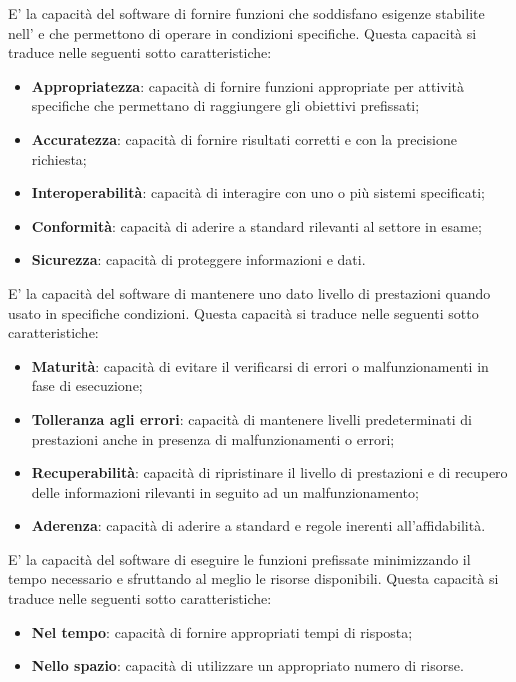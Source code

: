 	E' la capacità del software di fornire funzioni che soddisfano esigenze stabilite nell'\AdR{} e che permettono di operare in condizioni specifiche. Questa capacità si traduce nelle seguenti sotto caratteristiche:
	\begin{itemize}
		\item{\textbf{Appropriatezza}: capacità di fornire funzioni appropriate per attività specifiche che permettano di raggiungere gli obiettivi prefissati;}
		\item{\textbf{Accuratezza}: capacità di fornire risultati corretti e con la precisione richiesta;}
		\item{\textbf{Interoperabilità}: capacità di interagire con uno o più sistemi specificati;}
		\item{\textbf{Conformità}: capacità di aderire a standard rilevanti al settore in esame;}
		\item{\textbf{Sicurezza}: capacità di proteggere informazioni e dati.}
	\end{itemize}
	
	E' la capacità del software di mantenere uno dato livello di prestazioni quando usato in specifiche condizioni. Questa capacità si traduce nelle seguenti sotto caratteristiche:
	\begin{itemize}
		\item{\textbf{Maturità}: capacità di evitare il verificarsi di errori o malfunzionamenti in fase di esecuzione;}
		\item{\textbf{Tolleranza agli errori}: capacità di mantenere livelli predeterminati di prestazioni anche in presenza di malfunzionamenti o errori;}
		\item{\textbf{Recuperabilità}: capacità di ripristinare il livello di prestazioni e di recupero delle informazioni rilevanti in seguito ad un malfunzionamento;}
		\item{\textbf{Aderenza}: capacità di aderire a standard e regole inerenti all'affidabilità.}
	\end{itemize}
	
	E' la capacità del software di eseguire le funzioni prefissate minimizzando il tempo necessario e sfruttando al meglio le risorse disponibili. Questa capacità si traduce nelle seguenti sotto caratteristiche:
	\begin{itemize}
		\item{\textbf{Nel tempo}: capacità di fornire appropriati tempi di risposta;}
		\item{\textbf{Nello spazio}: capacità di utilizzare un appropriato numero di risorse.}
	\end{itemize}
	
